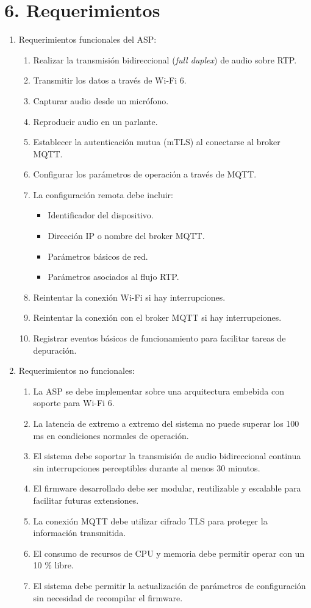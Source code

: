 \documentclass[
11pt, %
]{charter}
\begin{document}
\section{6. Requerimientos}
\label{sec:requerimientos}


\begin{enumerate}
	\item Requerimientos funcionales del ASP:
		\begin{enumerate}
			\item Realizar la transmisión bidireccional (\textit{full duplex}) de audio sobre RTP.
			\item Transmitir los datos a través de Wi-Fi 6.
			\item Capturar audio desde un micrófono.
			\item Reproducir audio en un parlante.			
			\item Establecer la autenticación mutua (mTLS) al conectarse al broker MQTT.
			\item Configurar los parámetros de operación a través de MQTT.
			\item La configuración remota debe incluir:
				\begin{itemize}
					\item Identificador del dispositivo.
					\item Dirección IP o nombre del broker MQTT.
					\item Parámetros básicos de red.
					\item Parámetros asociados al flujo RTP.
				\end{itemize}					
			\item Reintentar la conexión Wi-Fi si hay interrupciones.
			\item Reintentar la conexión con el broker MQTT si hay interrupciones.
			\item Registrar eventos básicos de funcionamiento para facilitar tareas de depuración.
		\end{enumerate}			

	\item Requerimientos no funcionales:
		\begin{enumerate}
			\item La ASP se debe implementar sobre una arquitectura embebida con soporte para Wi-Fi 6.
			\item La latencia de extremo a extremo del sistema no puede superar los 100 ms en condiciones normales de operación.
			\item El sistema debe soportar la transmisión de audio bidireccional continua sin interrupciones perceptibles durante al menos 30 minutos.
			\item El firmware desarrollado debe ser modular, reutilizable y escalable para facilitar futuras extensiones.
			\item La conexión MQTT debe utilizar cifrado TLS para proteger la información transmitida.
			\item El consumo de recursos de CPU y memoria debe permitir operar con un 10 \% libre.
			\item El sistema debe permitir la actualización de parámetros de configuración sin necesidad de recompilar el firmware.
		\end{enumerate}


\end{enumerate}
\end{document}
